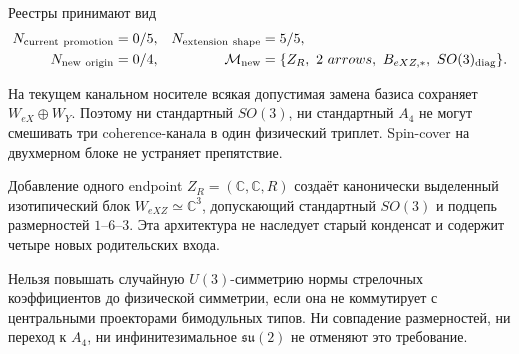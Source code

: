 Реестры принимают вид
\begin{equation}
 \begin{aligned}
 N_{\rm current\ promotion}&=0/5,
 &N_{\rm extension\ shape}&=5/5,\\
 N_{\rm new\ origin}&=0/4,
 &\mathcal M_{\rm new}&=\{Z_R,\ 2\ arrows,\ B_{eXZ,*},\ SO(3)_{\rm diag}\}.
 \end{aligned}
 \label{eq:v8-channel-promotion-ledgers}
\end{equation}

\begin{theorem}
На текущем канальном носителе всякая допустимая замена базиса сохраняет
$W_{eX}\oplus W_Y$. Поэтому ни стандартный $SO(3)$, ни стандартный $A_4$
не могут смешивать три coherence-канала в один физический триплет.
Spin-cover на двухмерном блоке не устраняет препятствие.
\end{theorem}

\begin{proposition}
Добавление одного endpoint $Z_R=(\mathbb C,\mathbb C,R)$ создаёт канонически
выделенный изотипический блок $W_{eXZ}\simeq\mathbb C^3$, допускающий
стандартный $SO(3)$ и подцепь размерностей $1$--$6$--$3$. Эта архитектура
не наследует старый конденсат и содержит четыре новых родительских входа.
\end{proposition}

\begin{nogocriterion}
Нельзя повышать случайную $U(3)$-симметрию нормы стрелочных коэффициентов до
физической симметрии, если она не коммутирует с центральными проекторами
бимодульных типов. Ни совпадение размерностей, ни переход к $A_4$, ни
инфинитезимальное $\mathfrak{su}(2)$ не отменяют это требование.
\end{nogocriterion}


